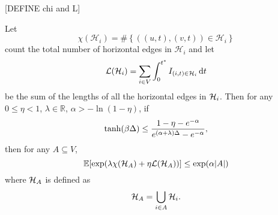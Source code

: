 	[DEFINE chi and L]

	\begin{lemma}
		\label{lem:full submartingale thing}
		Let 
		\begin{equation}
			\chi(\mathcal{H}_i) = \#\left\{ \left( (u,t), (v,t) \right) \in \mathcal{H}_i \right\}
		\end{equation}
		count the total number of horizontal edges in $\mathcal{H}_i$ and let 
		\begin{equation}
			\mathcal{L}(\mathcal{H}_i) = \sum_{i \in V} \int_{0}^{t^*} I_{(i, t) \in \mathcal{H}_i} \, \mathrm{d} t
		\end{equation}
		be the sum of the lengths of all the horizontal edges in $\mathcal{H}_i$. Then for any $0 \leq \eta < 1$, $\lambda \in \mathbb{R}$, $\alpha > -\ln(1 - \eta)$, if
		\begin{equation}
			\tanh(\beta\Delta) \leq \frac{1 - \eta - e^{-\alpha}}{e^{(\alpha+\lambda)\Delta} - e^{-\alpha}},
		\end{equation}
		then for any $A \subseteq V$,
		\begin{equation}
			\mathbb{E}[\exp(\lambda \chi(\mathcal{H}_A) + \eta \mathcal{L}(\mathcal{H}_A))] \leq \exp(\alpha |A|)
		\end{equation}
		where $\mathcal{H}_A$ is defined as
		\begin{equation}
			\mathcal{H}_A = \bigcup_{i \in A} \mathcal{H}_i.
		\end{equation}
	\end{lemma}
